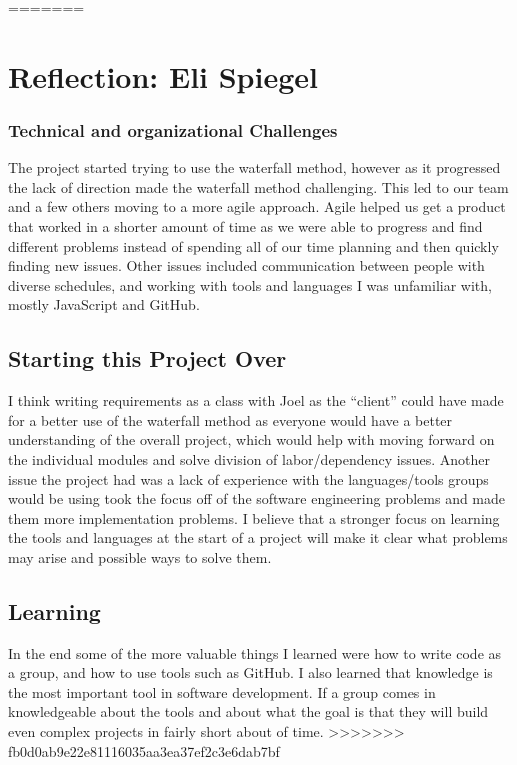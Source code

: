 \documentclass[a4paper]{article}
\begin{document}
=======
\section{Reflection: Eli Spiegel}
\subsubsection{Technical and organizational Challenges}
The project started trying to use the waterfall method, however as it progressed the lack of direction made the waterfall method challenging. This led to our team and a few others moving to a more agile approach. Agile helped us get a product that worked in a shorter amount of time as we were able to progress and find different problems instead of spending all of our time planning and then quickly finding new issues. Other issues included communication between people with diverse schedules, and working with tools and languages I was unfamiliar with, mostly JavaScript and GitHub.

\subsection{Starting this Project Over}
I think writing requirements as a class with Joel as the “client” could have made for a better use of the waterfall method as everyone would have a better understanding of the overall project, which would help with moving forward on the individual modules and solve division of labor/dependency issues. Another issue the project had was a lack of experience with the languages/tools groups would be using took the focus off of the software engineering problems and made them more implementation problems. I believe that a stronger focus on learning the tools and languages at the start of a project will make it clear what problems may arise and possible ways to solve them. 

\subsection{Learning}
In the end some of the more valuable things I learned were how to write code as a group, and how to use tools such as GitHub. I also learned that knowledge is the most important tool in software development.  If a group comes in knowledgeable about the tools and about what the goal is that they will build even complex projects in fairly short about of time.
>>>>>>> fb0d0ab9e22e81116035aa3ea37ef2c3e6dab7bf
\end{document}

